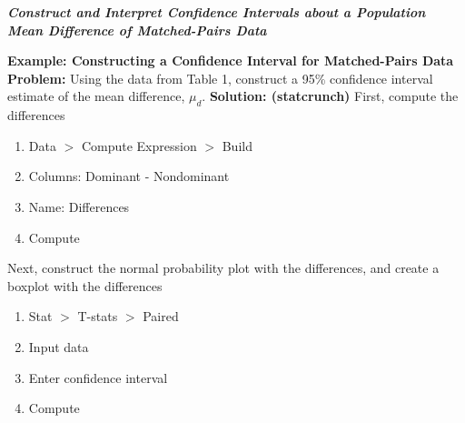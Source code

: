 \documentclass{report}
\begin{document}
    \pagebreak \bigbreak \noindent 
    \textbf{\textit{Construct and Interpret Confidence Intervals about a Population Mean Difference of Matched-Pairs Data}}
    \bigbreak \noindent 
    \begin{mdframed}
      \textbf{Example: Constructing a Confidence Interval for Matched-Pairs Data}
      \bigbreak \noindent 
      \textbf{Problem:}
      Using the data from Table 1, construct a 95\% confidence interval estimate of the mean difference, $\mu_{d}$.
        \bigbreak \noindent 
        \textbf{Solution: (statcrunch)}
        \bigbreak \noindent 
        First, compute the differences
        \begin{enumerate}
            \item Data $> $ Compute Expression $> $ Build
            \item Columns: Dominant - Nondominant
            \item Name: Differences
            \item Compute
        \end{enumerate}
        \bigbreak \noindent 
        Next, construct the normal probability plot with the differences, and create a boxplot with the differences
        \bigbreak \noindent 
        \begin{enumerate}
            \item Stat $> $ T-stats $> $ Paired 
            \item Input data
            \item Enter confidence interval
            \item Compute
        \end{enumerate}
    \end{mdframed}

    \pagebreak \bigbreak \noindent 
\end{document}
